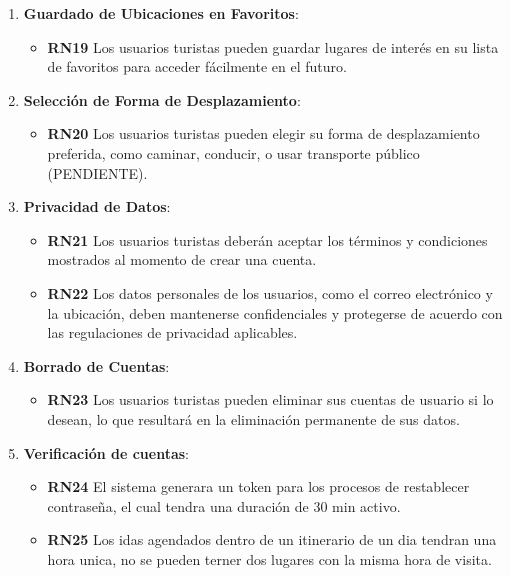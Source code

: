 \documentclass{article}
\begin{document}
\begin{enumerate}
\begin{itemize}
    \end{itemize}
    
    \item \textbf{Guardado de Ubicaciones en Favoritos}:
    \begin{itemize}
        \item \textbf{RN19} Los usuarios turistas pueden guardar lugares de interés en su lista de favoritos para acceder fácilmente en el futuro.
    \end{itemize}
    
    \item \textbf{Selección de Forma de Desplazamiento}:
    \begin{itemize}
        \item \textbf{RN20} Los usuarios turistas pueden elegir su forma de desplazamiento preferida, como caminar, conducir, o usar transporte público (PENDIENTE).
    \end{itemize}
    
    \item \textbf{Privacidad de Datos}:
    \begin{itemize}
        \item \textbf{RN21} Los usuarios turistas deberán aceptar los términos y condiciones mostrados al momento de crear una cuenta.
        \item \textbf{RN22} Los datos personales de los usuarios, como el correo electrónico y la ubicación, deben mantenerse confidenciales y protegerse de acuerdo con las regulaciones de privacidad aplicables.
    \end{itemize}
    
    \item \textbf{Borrado de Cuentas}:
    \begin{itemize}
        \item \textbf{RN23} Los usuarios turistas pueden eliminar sus cuentas de usuario si lo desean, lo que resultará en la eliminación permanente de sus datos.
    \end{itemize}
    \item \textbf{Verificación de cuentas}:
    \begin{itemize}
        \item \textbf{RN24} El sistema generara un token para los procesos de restablecer contraseña, el cual tendra una duración de 30 min activo.
        \item \textbf{RN25} Los idas agendados dentro de un itinerario de un dia tendran una hora unica, no se pueden terner dos lugares con la misma hora de visita.
    \end{itemize}
\end{enumerate}
\end{document}
